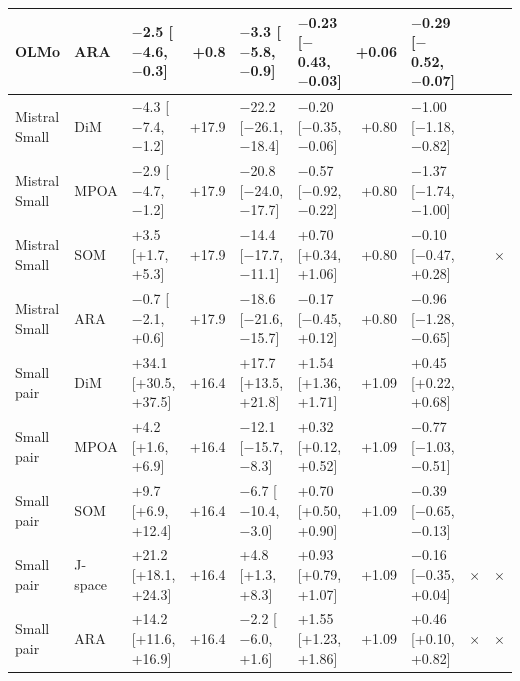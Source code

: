 \begin{table}[t]
\begin{tabular}{@{}lllrllrlcc@{}}
OLMo & ARA & $-$2.5 [$-$4.6, $-$0.3] & +0.8 & $-$3.3 [$-$5.8, $-$0.9] & $-$0.23 [$-$0.43, $-$0.03] & +0.06 & $-$0.29 [$-$0.52, $-$0.07] &  &  \\
\midrule
Mistral Small & DiM & $-$4.3 [$-$7.4, $-$1.2] & +17.9 & $-$22.2 [$-$26.1, $-$18.4] & $-$0.20 [$-$0.35, $-$0.06] & +0.80 & $-$1.00 [$-$1.18, $-$0.82] &  &  \\
Mistral Small & MPOA & $-$2.9 [$-$4.7, $-$1.2] & +17.9 & $-$20.8 [$-$24.0, $-$17.7] & $-$0.57 [$-$0.92, $-$0.22] & +0.80 & $-$1.37 [$-$1.74, $-$1.00] &  &  \\
Mistral Small & SOM & +3.5 [+1.7, +5.3] & +17.9 & $-$14.4 [$-$17.7, $-$11.1] & +0.70 [+0.34, +1.06] & +0.80 & $-$0.10 [$-$0.47, +0.28] &  & $\times$ \\
Mistral Small & ARA & $-$0.7 [$-$2.1, +0.6] & +17.9 & $-$18.6 [$-$21.6, $-$15.7] & $-$0.17 [$-$0.45, +0.12] & +0.80 & $-$0.96 [$-$1.28, $-$0.65] &  &  \\
\midrule
Small pair & DiM & +34.1 [+30.5, +37.5] & +16.4 & +17.7 [+13.5, +21.8] & +1.54 [+1.36, +1.71] & +1.09 & +0.45 [+0.22, +0.68] &  &  \\
Small pair & MPOA & +4.2 [+1.6, +6.9] & +16.4 & $-$12.1 [$-$15.7, $-$8.3] & +0.32 [+0.12, +0.52] & +1.09 & $-$0.77 [$-$1.03, $-$0.51] &  &  \\
Small pair & SOM & +9.7 [+6.9, +12.4] & +16.4 & $-$6.7 [$-$10.4, $-$3.0] & +0.70 [+0.50, +0.90] & +1.09 & $-$0.39 [$-$0.65, $-$0.13] &  &  \\
Small pair & J-space & +21.2 [+18.1, +24.3] & +16.4 & +4.8 [+1.3, +8.3] & +0.93 [+0.79, +1.07] & +1.09 & $-$0.16 [$-$0.35, +0.04] & $\times$ & $\times$ \\
Small pair & ARA & +14.2 [+11.6, +16.9] & +16.4 & $-$2.2 [$-$6.0, +1.6] & +1.55 [+1.23, +1.86] & +1.09 & +0.46 [+0.10, +0.82] & $\times$ & $\times$ \\
\bottomrule
\end{tabular}
\end{table}
